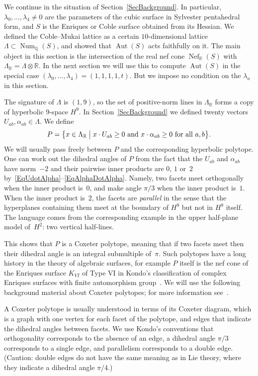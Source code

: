 \documentclass[11pt]{article}
\theoremstyle{definition}
\numberwithin{equation}{section}
\numberwithin{figure}{section}
\numberwithin{table}{section}
\newcommand*\sset{\subset}
\newcommand*\Q{\mathbb{Q}}
\newcommand*\R{\mathbb{R}}
\newcommand*\tensor{\otimes}
\DeclareMathOperator{\Aut}{Aut}
\DeclareMathOperator{\Nef}{Nef}
\DeclareMathOperator{\Num}{Num}
\begin{document}
We continue in the situation of Section~\ref{SecBackground}. In particular, $\lambda_0,\dots,\lambda_4\neq0$ are the parameters of the cubic surface in Sylvester pentahedral form, and $S$ is the Enriques or Coble surface obtained from its Hessian. We defined the Coble--Mukai lattice as a certain $10$-dimensional lattice $\Lambda\sset\Num_\Q(S)$, and showed that $\Aut(S)$ acts faithfully on it. The main object in this section is the intersection of the real nef cone $\Nef_\R(S)$ with $\Lambda_\R=\Lambda\tensor\R$. In the next section we will use this to compute $\Aut(S)$ in the special case $(\lambda_0,\dots,\lambda_4)=(1,1,1,1,t)$. But we impose no condition on the $\lambda_a$ in this section.

The signature of $\Lambda$ is $(1,9)$, so the set of positive-norm lines in $\Lambda_\R$ forms a copy of hyperbolic $9$-space $H^9$. In Section~\ref{SecBackground} we defined twenty vectors $U_{ab},\alpha_{ab}\in\Lambda$. We define
\begin{equation*}
P=\bigl\{ x\in\Lambda_\R
\bigm|x\cdot U_{ab}\geq0\text{ and }x\cdot\alpha_{ab}\geq0\text{ for all }a,b
\bigr\}.
\end{equation*}
We will usually pass freely between $P$ and the corresponding hyperbolic polytope. One can work out the dihedral angles of $P$ from the fact that the $U_{ab}$ and $\alpha_{ab}$ have norm~$-2$ and their pairwise inner products are $0$, $1$ or~$2$ by~\eqref{EqUdotAlpha}--\eqref{EqAlphaDotAlpha}. Namely, two facets meet orthogonally when the inner product is~$0$, and make angle $\pi/3$ when the inner product is~$1$. When the inner product is~$2$, the facets are \emph{parallel} in the sense that the hyperplanes containing them meet at the boundary of $H^9$ but not in $H^9$ itself. The language comes from the corresponding example in the upper half-plane model of~$H^2$: two vertical half-lines.

This shows that $P$ is a Coxeter polytope, meaning that if two facets meet then their dihedral angle is an integral submultiple of~$\pi$. Such polytopes have a long history in the theory of algebraic surfaces, for example $P$ itself is the nef cone of the Enriques surface $K_{VI}$ of Type VI in Kondo's classification of complex Enriques surfaces with finite automorphism group~\cite{Kondo}. We will use the following background material about Coxeter polytopes; for more information see~\cite{DolgachevBulletin,Vinberg2}.

A Coxeter polytope is usually understood in terms of its Coxeter diagram, which is a graph with one vertex for each facet of the polytope, and edges that indicate the dihedral angles between facets. We use Kondo's conventions that orthogonality corresponds to the absence of an edge, a dihedral angle $\pi/3$ corresponds to a single edge, and parallelism corresponds to a double edge. (Caution: double edges do not have the same meaning as in Lie theory, where they indicate a dihedral angle $\pi/4$.)
\end{document}
